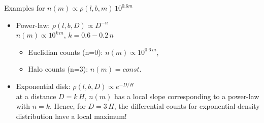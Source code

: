 \documentclass[letterpaper,landscape]{slides}
\begin{document}

\begin{slide}
\begin{center}
{\large \color{red}  Examples for $n(m)\propto \rho(l,b,m)\, 10^{0.6m}$ }
\end{center}

\begin{itemize}
\item
{\color{red} Power-law: $ \rho(l,b,D) \propto D^{-n}$} \\

    {\color{blue} \hskip 1.5in    $  n(m) \propto 10^{k\, m}$, $k= 0.6-0.2\,n$}
        \begin{itemize}
         \item
            Euclidian counts (n=0):  $n(m) \propto 10^{0.6\, m}$,
          \item
            Halo counts (n=3):  $n(m) = const.$
       \end{itemize}  
\item 
{\color{red} Exponential disk:  $\rho(l,b,D) \propto e^{-D/H}$} \\
at a distance $D=k\,H$, $n(m)$ has a local slope corresponding to a power-law 
with $n=k$. Hence, for $D=3\,H$, the differential counts for exponential density
distribution have a local maximum! 
\end{itemize}  

\vfill
\end{slide}


\begin{slide}
	\begin{center}
		\begin{minipage}{7in}
			\phantom{x} \vskip -2.0in
			\phantom{x} \hskip -0.5in
			{}
		\end{minipage}
	\end{center}
	\vfill
\end{slide}


\end{document}

